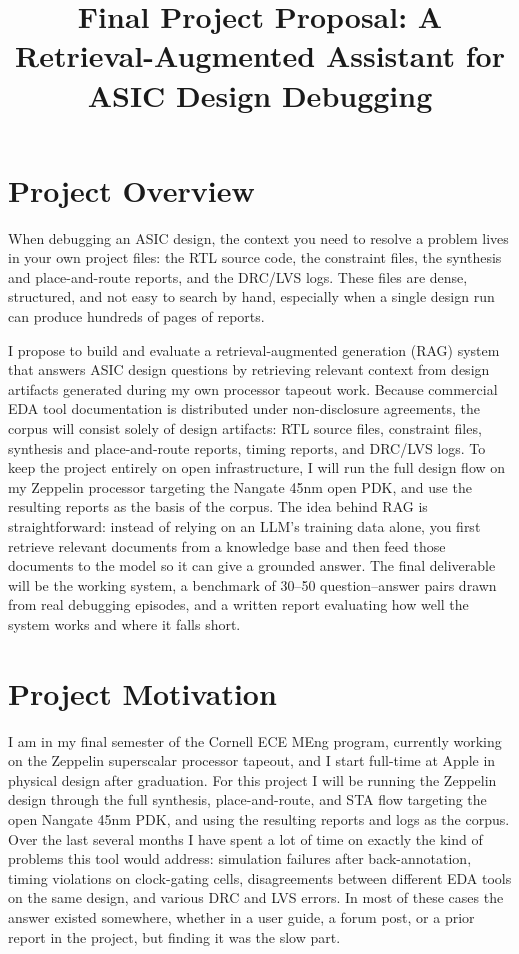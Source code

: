 \documentclass[conference]{IEEEtran}
\title{Final Project Proposal: A Retrieval-Augmented Assistant for ASIC Design Debugging}
\author{
    \IEEEauthorblockN{Parker Schless (pis7)}
    \IEEEauthorblockA{ENMGT 5400: Applications of Artificial Intelligence for Engineering Managers \\
    Cornell University: School of Engineering Management}
}
\begin{document}
\maketitle

\section{Project Overview}
When debugging an ASIC design, the context you need to resolve a problem lives in your own project files: the RTL source code, the constraint files, the synthesis and place-and-route reports, and the DRC/LVS logs. These files are dense, structured, and not easy to search by hand, especially when a single design run can produce hundreds of pages of reports.

I propose to build and evaluate a retrieval-augmented generation (RAG) system that answers ASIC design questions by retrieving relevant context from design artifacts generated during my own processor tapeout work. Because commercial EDA tool documentation is distributed under non-disclosure agreements, the corpus will consist solely of design artifacts: RTL source files, constraint files, synthesis and place-and-route reports, timing reports, and DRC/LVS logs. To keep the project entirely on open infrastructure, I will run the full design flow on my Zeppelin processor targeting the Nangate 45nm open PDK, and use the resulting reports as the basis of the corpus. The idea behind RAG is straightforward: instead of relying on an LLM's training data alone, you first retrieve relevant documents from a knowledge base and then feed those documents to the model so it can give a grounded answer. The final deliverable will be the working system, a benchmark of 30--50 question--answer pairs drawn from real debugging episodes, and a written report evaluating how well the system works and where it falls short.

\section{Project Motivation}
I am in my final semester of the Cornell ECE MEng program, currently working on the Zeppelin superscalar processor tapeout, and I start full-time at Apple in physical design after graduation. For this project I will be running the Zeppelin design through the full synthesis, place-and-route, and STA flow targeting the open Nangate 45nm PDK, and using the resulting reports and logs as the corpus. Over the last several months I have spent a lot of time on exactly the kind of problems this tool would address: simulation failures after back-annotation, timing violations on clock-gating cells, disagreements between different EDA tools on the same design, and various DRC and LVS errors. In most of these cases the answer existed somewhere, whether in a user guide, a forum post, or a prior report in the project, but finding it was the slow part.
\end{document}
